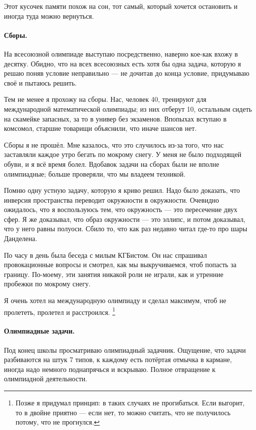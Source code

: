 \documentclass{book}
\begin{document}
Этот кусочек памяти похож на сон, 
тот самый, который хочется остановить и иногда туда можно вернуться.


\paragraph{Сборы.} На всесоюзной олимпиаде выступаю посредственно,
наверно кое-как вхожу в десятку.
Обидно, что на всех всесоюзных есть хотя бы одна задача,
которую я решаю поняв условие неправильно --- не дочитав до конца условие, придумываю своё и пытаюсь решить.

Тем не менее я прохожу на сборы.
Нас, человек 40, тренируют для международной математической олимпиады;
из них отберут 10, остальным сидеть на скамейке запасных, за то в универ без экзаменов.
Впопыхах вступаю в комсомол, старшие товарищи объяснили, что иначе шансов нет.

Сборы я не прошёл.
Мне казалось, что это случилось из-за того, что нас заставляли каждое утро бегать по мокрому снегу.
У меня не было подходящей обуви, и я всё время болел.
Вдобавок задачи на сборах были не вполне олимпиадные;
больше проверяли, что мы владеем техникой.

Помню одну устную задачу, которую я криво решил.
Надо было доказать, что инверсия пространства переводит окружности в окружности.
Очевидно ожидалось, что я воспользуюсь тем,
что окружность --- это пересечение двух сфер.
Я же доказывал, что образ окружности --- это эллипс,
и потом доказывал, что у него равны полуоси.
Сбило то, что как раз недавно читал где-то про шары Данделена.

По часу в день была
беседа с милым КГБистом.
Он нас спрашивал провокационные вопросы
и смотрел, как мы выкручиваемся, 
чтоб попасть за границу.
По-моему, эти занятия никакой роли не играли,
как и утренние пробежки по мокрому снегу.

Я очень хотел на международную олимпиаду и сделал максимум, чтоб не пролететь,
пролетел и расстроился.%
\footnote{Позже я придумал принцип: в таких случаях не прогибаться.
Если выгорит, то в двойне приятно --- если нет, 
то  можно считать, что не получилось потому, что не прогнулся.}

\paragraph{Олимпиадные задачи.}
Под конец школы просматриваю олимпиадный задачник.
Ощущение, что задачи разбиваются на штук 7 типов,
к каждому есть потёртая отмычка в кармане,
иногда надо немного поднапрячься и вскрываю.
Полное отвращение к олимпиадной деятельности.
\end{document}

